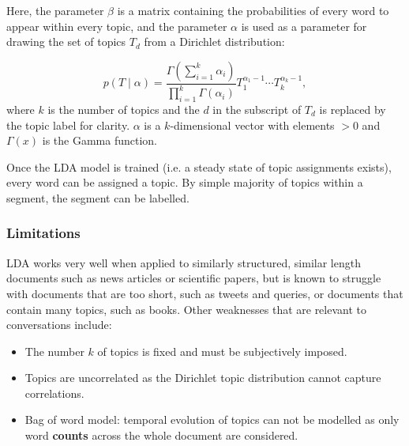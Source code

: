     Here, the parameter $\beta$ is a matrix containing the probabilities of every word to appear within every topic, and the parameter $\alpha$ is used as a parameter for drawing the set of topics $T_d$ from a Dirichlet distribution:
    
    \begin{equation}
        p(T \mid \alpha)=\frac{\Gamma\left(\sum_{i=1}^{k} \alpha_{i}\right)}{\prod_{i=1}^{k} \Gamma\left(\alpha_{i}\right)} T_{1}^{\alpha_{1}-1} \cdots T_{k}^{\alpha_{k}-1},
    \end{equation}
    where $k$ is the number of topics and the $d$ in the subscript of $T_d$ is replaced by the topic label for clarity. $\alpha$ is a $k$-dimensional vector with elements $> 0$ and $\Gamma(x)$ is the Gamma function.
    
    Once the LDA model is trained (i.e. a steady state of topic assignments exists), every word can be assigned a topic. By simple majority of topics within a segment, the segment can be labelled.
    
    \subsubsection{Limitations}
    LDA works very well when applied to similarly structured, similar length documents such as news articles\cite{blei2003latent, newman2006probabilistic} or scientific papers\cite{griffiths2004finding, wang2011collaborative}, but is known to struggle with documents that are too short, such as tweets and queries, or documents that contain many topics, such as books\cite{tang2014understanding}. Other weaknesses that are relevant to conversations include:
    
    \begin{itemize}
        \item The number $k$ of topics is fixed and must be subjectively imposed.
        \item Topics are uncorrelated as the Dirichlet topic distribution cannot capture correlations.
        \item Bag of word model: temporal evolution of topics can not be modelled as only word \textbf{counts} across the whole document are considered.
    \end{itemize}
    
